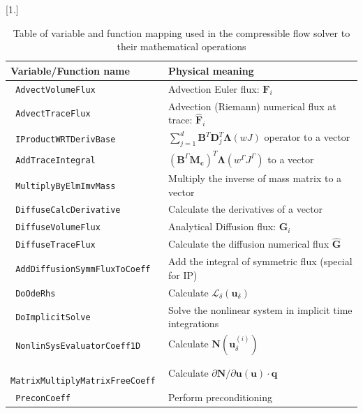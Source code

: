     \begin {table}[htbp!]
    \caption {Table of variable and function mapping used in the compressible flow solver to their mathematical operations} \label{tab:CFSFunctionName} 
    \begin{center}
    \scalebox{0.9}[1.]{
    \begin{tabular}{ | l | l|}
      \hline      
      \textbf{ Variable/Function name} & \textbf{ Physical meaning} \\  
      \hline
      \texttt{ AdvectVolumeFlux}  & Advection Euler flux: $\textbf{F}_{i}$\\
      \hline
      \texttt{ AdvectTraceFlux}  & Advection (Riemann) numerical flux at trace: $\hat{\textbf{F}}_{i}$\\
      \hline
      \texttt{ IProductWRTDerivBase} &  $\sum_{j=1}^{d}\mathbf{B}^{T}\mathbf{D}_{j}^{T}\mathbf{\Lambda}\left(wJ\right)$ operator to a vector\\
      \hline
      \texttt{ AddTraceIntegral} &  $\left(\mathbf{B}^{\varGamma}\mathbf{M_{c}}\right)^{T}\mathbf{\Lambda}\left(w^{\varGamma}J^{\varGamma}\right)$ to a vector\\ 
      \hline
      \texttt{ MultiplyByElmImvMass} & Multiply the inverse of mass matrix to a vector\\
      \hline
      \texttt{ DiffuseCalcDerivative} & Calculate the derivatives of a vector\\
      \hline
      \texttt{ DiffuseVolumeFlux} & Analytical Diffusion flux: $\textbf{G}_{i}$ \\
      \hline
      \texttt{ DiffuseTraceFlux} & Calculate the diffusion numerical flux $ \hat{\textbf{G}}$\\
      \hline
      \texttt{ AddDiffusionSymmFluxToCoeff} & Add the integral of symmetric flux (special for IP)\\
      \hline
      \texttt{ DoOdeRhs} & Calculate $\mathcal{L}_\delta \left(\textbf{u}_{\delta}\right)$\\
      \hline
      \texttt{ DoImplicitSolve} & Solve the nonlinear system in implicit time integrations\\
      \hline
      \texttt{ NonlinSysEvaluatorCoeff1D} & Calculate $\textbf{N}(\textbf{u}_{\delta}^{(i)})$\\
      \hline
      \texttt{ MatrixMultiplyMatrixFreeCoeff} & Calculate ${\partial\mathbf{N}}/{\partial\mathbf{u}}\left(\mathbf{u}\right)\cdot\mathbf{q}$\\
      \hline
      \texttt{ PreconCoeff} & Perform preconditioning\\
      \hline
    \end{tabular}
    }
    \end{center}
    \end{table}


